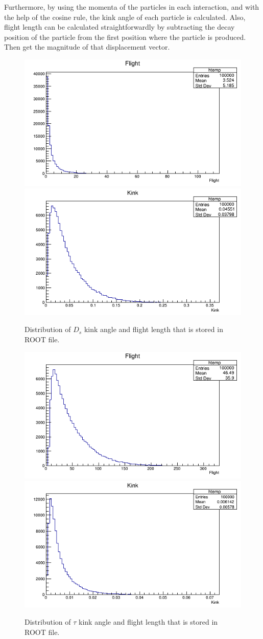 \documentclass[12pt]{report}
\begin{document}
Furthermore, by using the momenta of the particles in each interaction, and with the help of the cosine rule, the kink angle of each particle is calculated. Also, flight length can be calculated straightforwardly by subtracting the decay position of the particle from the first position where the particle is produced. Then get the magnitude of that displacement vector.

\begin{figure}[htp]
\centering
\includegraphics[width = 7 cm]{PythiaDsFLength.png}
\includegraphics[width = 7 cm]{PythiaDsKAngle.png}
\caption{Distribution of $D_s$ kink angle and flight length that is stored in ROOT file.}
\label{fig:DsRoot}
\end{figure}

\begin{figure}[htp]
\centering
\includegraphics[width = 7 cm]{PythiaTauFLength.png}
\includegraphics[width = 7 cm]{PythiaTauKAngle.png}
\caption{Distribution of $\tau$ kink angle and flight length that is stored in ROOT file.}
\label{fig:TauRoot}
\end{figure}
\end{document}
